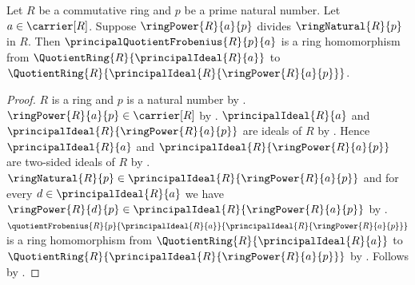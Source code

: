 \begin{theorem}\label{principal_quotient_frobenius_hom}
    Let $R$ be a commutative ring and $p$ be a prime natural number.
    Let $a\in\carrier[R]$.
    Suppose $\ringPower{R}{a}{p}$ divides $\ringNatural{R}{p}$ in $R$.
    Then $\principalQuotientFrobenius{R}{p}{a}$ is a ring homomorphism
        from $\QuotientRing{R}{\principalIdeal{R}{a}}$ to
        $\QuotientRing{R}{
            \principalIdeal{R}{\ringPower{R}{a}{p}}}$.
\end{theorem}
\begin{proof}
    $R$ is a ring and $p$ is a natural number by
        .
    $\ringPower{R}{a}{p}\in\carrier[R]$ by .
    $\principalIdeal{R}{a}$ and
        $\principalIdeal{R}{\ringPower{R}{a}{p}}$
        are ideals of $R$ by .
    Hence $\principalIdeal{R}{a}$ and
        $\principalIdeal{R}{\ringPower{R}{a}{p}}$
        are two-sided ideals of $R$ by .
    $\ringNatural{R}{p}
            \in\principalIdeal{R}{\ringPower{R}{a}{p}}$ and
        for every $d\in\principalIdeal{R}{a}$ we have
            $\ringPower{R}{d}{p}
                \in\principalIdeal{R}{\ringPower{R}{a}{p}}$ by
        .
    $\quotientFrobenius{R}{p}{\principalIdeal{R}{a}}{
            \principalIdeal{R}{\ringPower{R}{a}{p}}}$
        is a ring homomorphism from
        $\QuotientRing{R}{\principalIdeal{R}{a}}$ to
        $\QuotientRing{R}{
            \principalIdeal{R}{\ringPower{R}{a}{p}}}$ by
        .
    Follows by .
\end{proof}

